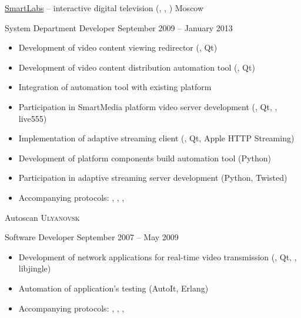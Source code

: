 \documentclass[unicode, 10pt, a4paper, oneside, fleqn]{article}
\begin{document}
\job  %
    {\href{http://www.smartlabs.tv}{SmartLabs} -- interactive digital
           television (, , )}
    {Moscow}
    {
        \position %
            {System Department Developer}
            {September 2009 -- January 2013}
            {
                \begin{itemize}
                    \item{Development of video content viewing redirector (\CPP, Qt)}
                    \item{Development of video content distribution automation tool (\CPP, Qt)}
                    \item{Integration of automation tool with existing platform}
                    \item{Participation in SmartMedia platform video server development
                          (\CPP, Qt, , live555)}
                    \item{Implementation of adaptive streaming client (\CPP, Qt, Apple HTTP Streaming)}
                    \item{Development of platform components build automation tool (Python)}
                    \item{Participation in adaptive streaming server development
                          (Python, Twisted)}
                    \item{Accompanying protocols: , ,
                          , }
                \end{itemize}
            }
    }


\job
    {Autoscan}
    {\textsc{Ulyanovsk}}
    {
        \position
            {Software Developer}
            {September 2007 -- May 2009}
            {
                \begin{itemize}
                    \item{Development of network applications for real-time video
                          transmission (\CPP, Qt, , libjingle)}
                    \item{Automation of application's testing (AutoIt, Erlang)}
                    \item{Accompanying protocols: , , ,
                          }
                \end{itemize}
            }
    }
\end{document}
